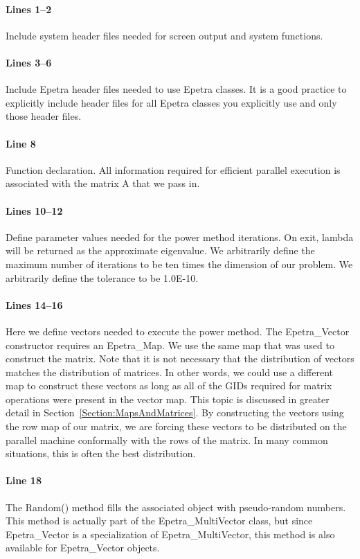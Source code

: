 \documentclass[12pt,relax]{EpetraUserGuide}
\newcommand{\map}{Epetra\_Map}
\renewcommand{\vector}{Epetra\_Vector}
\newcommand{\multivector}{Epetra\_MultiVector}
\begin{document}
\paragraph{Lines 1--2}
Include system header files needed for screen output and system
functions.
\paragraph{Lines 3--6}
Include Epetra header files needed to use Epetra classes.
It is a good practice to explicitly include header files for all
Epetra classes you explicitly use and only those header files.
\paragraph{Line 8} Function declaration.  All information required for
efficient parallel execution is associated with the matrix A that we
pass in.
\paragraph{Lines 10--12}
Define parameter values needed for the power method iterations.  On
exit, lambda will be returned as the approximate eigenvalue.  We
arbitrarily define the maximum number of iterations to be ten times
the dimension of our problem.  We arbitrarily define the tolerance to
be 1.0E-10.
\paragraph{Lines 14--16}
Here we define vectors needed to execute the power method.  The
\vector{} constructor requires an \map{}.  We use the same map that
was used to construct the matrix.  Note that it is not necessary that
the distribution of vectors matches the distribution of matrices.  In
other words, we could use a different map to construct these vectors
as long as all of the GIDs required for matrix operations were present
in the vector map.  This topic is discussed in greater detail in
Section~\ref{Section:MapsAndMatrices}.  By constructing the vectors using
the row map of our matrix, we are forcing these vectors to be
distributed on the parallel machine conformally with the rows of the
matrix.  In many common situations, this is often the best 
distribution.
\paragraph{Line 18}
The Random() method fills the associated object with pseudo-random
numbers.  This method is actually part of the \multivector{} class,
but since \vector{} is a specialization of \multivector{}, this method
is also available for \vector{} objects.
\end{document}
